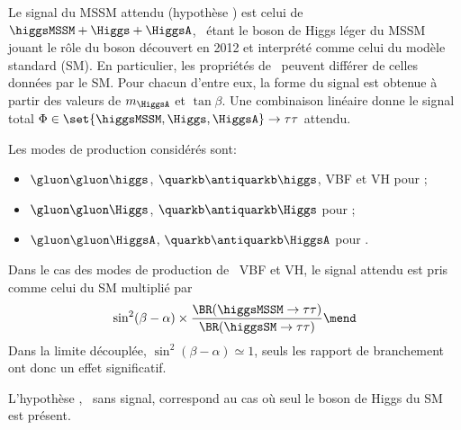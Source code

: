 \par
Le signal du MSSM attendu (hypothèse \hypSB) est celui de $\higgsMSSM+\Higgs+\HiggsA$, \higgsMSSM\ étant le boson de Higgs léger du MSSM jouant le rôle du boson découvert en 2012 et interprété comme celui du modèle standard (SM).
En particulier, les propriétés de \higgsMSSM\ peuvent différer de celles données par le SM.
Pour chacun d'entre eux, la forme du signal est obtenue à partir des valeurs de $m_{\HiggsA}$ et $\tan\beta$.
Une combinaison linéaire donne le signal total $\Phi\in\set{\higgsMSSM,\Higgs,\HiggsA}\to\tau\tau$ attendu.
\par
Les modes de production considérés sont:
\begin{itemize}
\item $\gluon\gluon\higgs$, $\quarkb\antiquarkb\higgs$, VBF et VH pour \higgsMSSM;
\item $\gluon\gluon\Higgs$, $\quarkb\antiquarkb\Higgs$ pour \Higgs;
\item $\gluon\gluon\HiggsA$, $\quarkb\antiquarkb\HiggsA$ pour \HiggsA.
\end{itemize}
Dans le cas des modes de production de \higgsMSSM\ VBF et VH,
le signal attendu est pris comme celui du SM multiplié par
\begin{equation}
\sin^2(\beta-\alpha) \times \frac{\BR(\higgsMSSM\to\tau\tau)}{\BR(\higgsSM\to\tau\tau)}
\mend
\end{equation}
Dans la limite découplée, $\sin^2(\beta-\alpha)\simeq1$, seuls les rapport de branchement ont donc un effet significatif.
\par
L'hypothèse \hypB, \ie\ sans signal, correspond au cas où seul le boson de Higgs du SM est présent.
